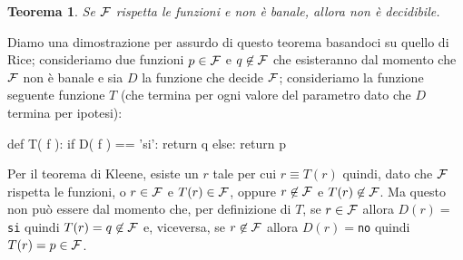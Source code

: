 \documentclass[a4paper]{article}
\newtheorem{teo}{Teorema}
\begin{document}
\begin{teo}
Se $\cal F$ rispetta le funzioni e non è banale, allora non è decidibile.
\end{teo}

Diamo una dimostrazione per assurdo di questo teorema basandoci su quello di
Rice; consideriamo due funzioni $p\in\cal F$ e $q\not\in\cal F$ che
esisteranno dal momento che $\cal F$ non è banale e sia $D$ la funzione che
decide $\cal F$; consideriamo la funzione seguente funzione $T$ (che termina
per ogni valore del parametro dato che $D$ termina per ipotesi):

\begin{pycode}
def T( f ):
  if D( f ) == 'si':
    return q
  else:
    return p
\end{pycode}

Per il teorema di Kleene, esiste un $r$ tale per cui $r\equiv T(r)$ quindi,
dato che $\cal F$ rispetta le funzioni, o $r\in\cal F$ e $T(r)\in\cal F$,
oppure $r\not\in\cal F$ e $T(r)\not\in\cal F$. Ma questo non può essere dal
momento che, per definizione di $T$, se $r\in\cal F$ allora $D(r)=$\verb|si| quindi
$T(r)=q\not\in\cal F$ e, viceversa, se $r\not\in\cal F$ allora
$D(r)=$\verb|no| quindi $T(r)=p\in\cal F$.
\end{document}
